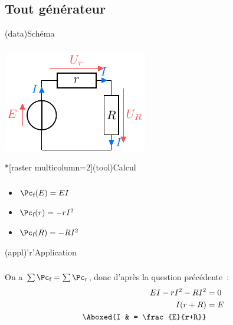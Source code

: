\documentclass[../../main/main.tex]{subfiles}
\begin{document}
{\subsection{Tout générateur}
\begin{tcbraster}[raster columns=7, raster equal height=rows]
    \begin{tcb}[raster multicolumn=2](data){Schéma}
        \subsubsection{}
        \vfill
        \begin{center}
            \includegraphics{convs_b}
        \end{center}
        \vfill
    \end{tcb}
    \begin{tcb}*[raster multicolumn=2](tool){Calcul}
        \subsubsection{}
        \vfill
        \begin{itemize}[leftmargin=20pt]
            \item $\Pc_{\text{f}}(E) = EI$
            \item $\Pc_{\text{f}}(r) = -rI^2$
            \item $\Pc_{\text{f}}(R) = -RI^2$
        \end{itemize}
        \vfill
    \end{tcb}
    \begin{tcb}[raster multicolumn=3](appl)'r'{Application}
        \subsubsection{}
        On a $\sum \Pc_{\text{f}} = \sum \Pc_{\text{r}}$, donc d'après
        la question précédente~:
        \begin{align*}
            EI - rI^2 - RI^2 & = 0\\
            I(r+R)           & = E\\
            \Aboxed{I        & = \frac{E}{r+R}}
        \end{align*}
    \end{tcb}
\end{tcbraster}

}
\end{document}
